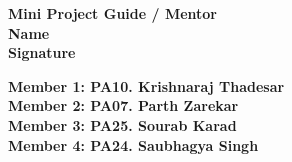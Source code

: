 \documentclass[11pt]{article}
\begin{document}
\vfill
\begin{minipage}[t]{0.5\textwidth}
    \raggedright
    \textbf{Mini Project Guide / Mentor}\\
    \vspace*{1cm}
    \textbf{Name}\\
    \vspace*{0.5cm}
    \textbf{Signature}
\end{minipage}%
\hfill
\begin{minipage}[t]{0.5\textwidth}
    \raggedright
    \textbf{Member 1: PA10. Krishnaraj Thadesar }\\
    \vspace*{0.9cm}
    \textbf{Member 2: PA07. Parth Zarekar}\\
    \vspace*{0.9cm}
    \textbf{Member 3: PA25. Sourab Karad }\\
    \vspace*{0.9cm}
    \textbf{Member 4: PA24. Saubhagya Singh }\\
    \vspace*{0.9cm}
\end{minipage}

\pagebreak
\end{document}
